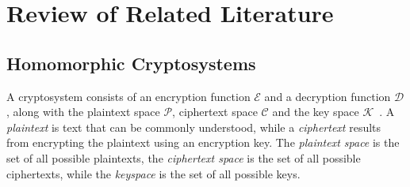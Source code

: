 \section{Review of Related Literature}
\label{sec:chapter_2}
\subsection{Homomorphic Cryptosystems}
A cryptosystem consists of an encryption function $\mathcal{E}$ and a decryption function $\mathcal{D}$, along with the plaintext space $\mathcal{P}$, ciphertext space $\mathcal{C}$ and the key space $\mathcal{K}$~\cite{bauer_cryptosystem_2005}. A \textit{plaintext} is text that can be commonly understood, while a \textit{ciphertext} results from encrypting the plaintext using an encryption key. The \textit{plaintext space} is the set of all possible plaintexts, the \textit{ciphertext space} is the set of all possible ciphertexts, while the \textit{keyspace} is the set of all possible keys.



